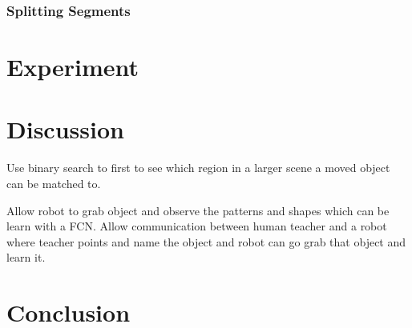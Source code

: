 \documentclass{article}
\begin{document}
\subsubsection{Splitting Segments}

\section{Experiment}

\section{Discussion}

Use binary search to first to see which region in a larger scene a moved object can be matched to.

Allow robot to grab object and observe the patterns and shapes which can be learn with a FCN. Allow communication between human teacher and a robot where teacher points and name the object and robot can go grab that object and learn it.  

\section{Conclusion}
\end{document}
